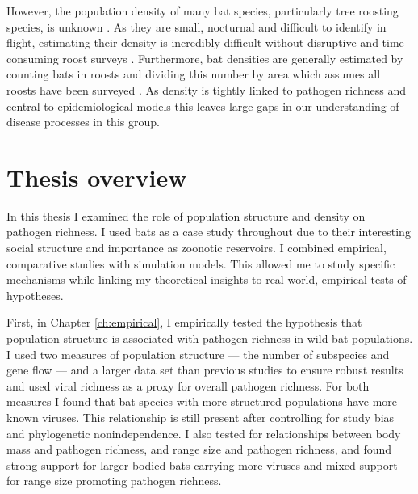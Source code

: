 However, the population density of many bat species, particularly tree roosting species, is unknown \cite{clement2013estimating}.
As they are small, nocturnal and difficult to identify in flight, estimating their density is incredibly difficult without disruptive and time-consuming roost surveys \cite{kloepper2016estimating, humphrey1971photographic, sabol1995technique}.
Furthermore, bat densities are generally estimated by counting bats in roosts and dividing this number by area which assumes all roosts have been surveyed \cite{speakman1991minimum, zahn2006population, moreno2004colony}. 
As density is tightly linked to pathogen richness \cite{kamiya2014determines} and central to epidemiological models \cite{may1979population, anderson1979population} this leaves large gaps in our understanding of disease processes in this group.





\section{Thesis overview}

In this thesis I examined the role of population structure and density on pathogen richness.
I used bats as a case study throughout due to their interesting social structure and importance as zoonotic	reservoirs.
I combined empirical, comparative studies with simulation models.
This allowed me to study specific mechanisms while linking my theoretical insights to real-world, empirical tests of hypotheses.



First, in Chapter \ref{ch:empirical}, I empirically tested the hypothesis that population structure is associated with pathogen richness in wild bat populations.
I used two measures of population structure --- the number of subspecies and gene flow --- and a larger data set than previous studies to ensure robust results and used viral richness as a proxy for overall pathogen richness.
For both measures I found that bat species with more structured populations have more known viruses.
This relationship is still present after controlling for study bias and phylogenetic nonindependence.
I also tested for relationships between body mass and pathogen richness, and range size and pathogen richness, and found strong support for larger bodied bats carrying more viruses and mixed support for range size promoting pathogen richness.

